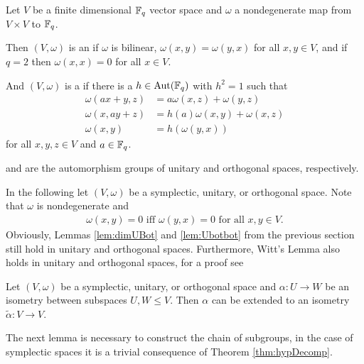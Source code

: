 \begin{definition}
Let $V$ be a finite dimensional $\mathbb{F}_q$ vector space and $\omega$ a nondegenerate map from $V\times V$ to $\mathbb{F}_q$.

Then $(V,\omega)$ is an  if $\omega$ is bilinear, $\omega(x,y)=\omega(y,x)$ for all $x,y\in V$, and if $q=2$ then $\omega(x,x)=0$ for all $x\in V$.

And $(V,\omega)$ is a  if there is a $h\in\operatorname{Aut}(\mathbb{F}_q)$ with $h^2=1$ such that 
\begin{align*}
\omega(ax+y,z)&=a\omega(x,z)+\omega(y,z)\\
\omega(x,ay+z)&=h(a)\omega(x,y)+\omega(x,z)\\
\omega(x,y)&=h(\omega(y,x))
\end{align*}
for all $x,y,z\in V$ and $a\in\mathbb{F}_q$.

 and  are the automorphism groups of unitary and orthogonal spaces, respectively.
\end{definition}

In the following let $(V,\omega)$ be a symplectic, unitary, or orthogonal space.
Note that $\omega$ is nondegenerate and 
\begin{align*}
\omega(x,y)=0 \text{ iff }\omega(y,x)=0\text{ for all $x,y\in V$}.
\end{align*}
Obviously, Lemmas \ref{lem:dimUBot} and \ref{lem:Ubotbot} from the previous section still hold in  unitary and orthogonal spaces. Furthermore, Witt's Lemma also holds in unitary and orthogonal spaces, for a proof see \cite{Witt}
\begin{theorem}\label{thm:Witt}
Let $(V,\omega)$ be a symplectic, unitary, or orthogonal space and $\alpha\colon U\to W$ be an isometry between subspaces $U,W\leq V$.
Then $\alpha$ can be extended to an isometry $\tilde{\alpha}\colon V\to V$.
\end{theorem}

The next lemma is necessary to construct the chain of subgroups, in the case of symplectic spaces it is a trivial consequence of Theorem \ref{thm:hypDecomp}.




